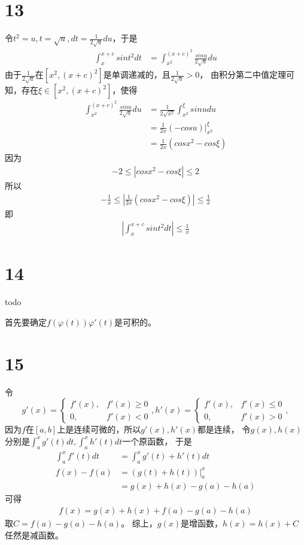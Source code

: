 \documentclass{article}
\begin{document}
\section*{13}

令$t^2 = u, t = \sqrt{u}, dt = \frac{1}{2\sqrt{u}}du$，于是
\begin{align*}
  \int_{x}^{x + c} sin t^2 dt
   & = \int_{x^2}^{(x + c)^2} \frac{sin u}{2\sqrt{u}}du
\end{align*}
由于$\frac{1}{2\sqrt{u}}$在$[x^2, (x + c)^2]$是单调递减的，且$\frac{1}{2\sqrt{u}} > 0$，
由积分第二中值定理可知，存在$\xi \in [x^2, (x + c)^2]$，使得
\begin{align*}
  \int_{x^2}^{(x + c)^2} \frac{sin u}{2\sqrt{u}}du
   & = \frac{1}{2\sqrt{x^2}} \int_{x^2}^{\xi} sin u du \\
   & = \frac{1}{2x} (- cos u)\bigg|_{x^2}^{\xi}        \\
   & = \frac{1}{2x} (cos x^2 - cos \xi)
\end{align*}
因为
\begin{align*}
  -2 \leq |cos x^2 - cos \xi| \leq 2
\end{align*}
所以
\begin{align*}
  - \frac{1}{x} \leq \left|\frac{1}{2x} (cos x^2 - cos \xi)\right| \leq \frac{1}{x}
\end{align*}
即
\begin{align*}
  \left| \int_{x}^{x + c} sin t^2 dt \right| \leq \frac{1}{x}
\end{align*}

\section*{14}
todo

首先要确定$f(\varphi(t))\varphi'(t)$是可积的。

\section*{15}

令
\begin{equation*}
  g'(x) =
  \begin{cases}
    f'(x), & f'(x) \geq 0 \\
    0,     & f'(x) < 0
  \end{cases},
  h'(x) =
  \begin{cases}
    f'(x), & f'(x) \leq 0 \\
    0,     & f'(x) > 0
  \end{cases},
\end{equation*}
因为$f$在$[a, b]$上是连续可微的，所以$g'(x), h'(x)$都是连续，
令$g(x), h(x)$分别是$\int_{a}^{x} g'(t) dt, \int_{a}^{x} h'(t) dt$一个原函数，
于是
\begin{align*}
  \int_{a}^{x} f'(t) dt & = \int_{a}^{x} g'(t) + h'(t) dt \\
  f(x) - f(a)           & = (g(t) + h(t))\bigg|_{a}^{x}   \\
                        & = g(x) + h(x) - g(a) - h(a)
\end{align*}
可得
\begin{align*}
  f(x) = g(x) + h(x) + f(a) - g(a) - h(a)
\end{align*}
取$C = f(a) - g(a) - h(a)$。
综上，$g(x)$是增函数，$h(x) = h(x) + C$任然是减函数。
\end{document}
